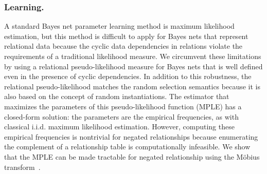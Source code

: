 \documentclass[oribibl]{llncs}
\begin{document}
\subsubsection{Learning.} 
A standard Bayes net  parameter learning method is maximum
likelihood estimation, but this method is difficult to apply for Bayes nets that represent
relational data because the cyclic data dependencies in relations violate the requirements of a traditional likelihood measure. 
We circumvent these limitations by using a relational pseudo-likelihood measure for Bayes nets \cite{Schulte2011} that is well defined even in the presence of cyclic dependencies. In addition to this robustness, the relational pseudo-likelihood matches the random selection semantics because it is also based on the concept of random instantiations.
The estimator that  maximizes the parameters of this pseudo-likelihood function (MPLE) has a closed-form solution: the parameters are the empirical frequencies, as with classical i.i.d. maximum likelihood estimation.
However, computing these empirical frequencies is nontrivial for negated relationships because
enumerating the complement of a relationship table is computationally infeasible. 
We show that the MPLE can be made tractable for negated relationship using the M\"obius transform~\cite{Kennes1990}. 


\end{document}
